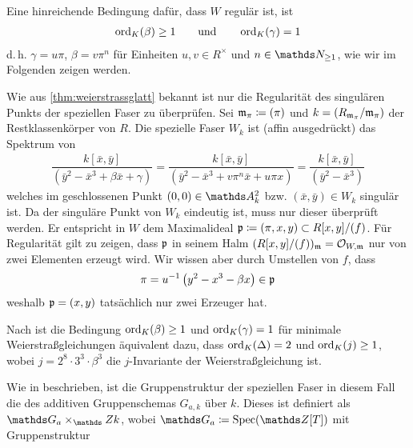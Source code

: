 \begin{Bemerkung}%
  \label{bem:bedregweierstraßmodell}
  Eine hinreichende Bedingung dafür, dass $W$ regulär ist, ist
  \begin{gather*}
    \operatorname{ord}_{K}(\beta)\geq 1
    \qquad\text{und}\qquad
    \operatorname{ord}_{K}(\gamma)=1
  \end{gather*}
  d.\,h. $\gamma=u\pi$, $\beta=v\pi^n$ für Einheiten $u,v\in R^\times$
  und $n\in\N_{\geq1}$, wie wir im Folgenden zeigen werden.
  
  Wie aus \ref{thm:weierstrassglatt} bekannt ist nur die
  Regularität des singulären Punkts der speziellen Faser zu
  überprüfen.
  Sei $\mathfrak{m}_\pi\coloneqq(\pi)$ und $k=(R_{\mathfrak{m}_\pi}/\mathfrak{m}_\pi)$ der
  Restklassenkörper von $R$.
  Die spezielle Faser $W_k$ ist (affin ausgedrückt) das Spektrum von
  \begin{gather*}
    \dfrac{k[\bar x,\bar y]}{(\bar y^2-\bar x^3+\beta \bar x+\gamma)}
    =\dfrac{k[\bar x,\bar y]}{(\bar y^2-\bar x^3+v\pi^n \bar x+u\pi x)}
    =\dfrac{k[\bar x,\bar y]}{(\bar y^2-\bar x^3)}
  \end{gather*}
  welches im geschlossenen Punkt $(0,0)\in\A_k^2$ bzw.
  $(\bar x,\bar y)\in W_k$ singulär ist. Da der singuläre Punkt von
  $W_k$ eindeutig ist, muss nur dieser überprüft werden.
  Er entspricht in $W$ dem Maximalideal
  $\mathfrak{p}\coloneqq(\pi,x,y)\subset R[x,y]/(f)$.
  Für Regularität gilt zu zeigen, dass $\mathfrak{p}$ in seinem Halm
  $(R[x,y]/(f))_{\mathfrak{m}}=\mathcal{O}_{W,\mathfrak{m}}$ nur von zwei Elementen erzeugt wird.
  Wir wissen aber durch Umstellen von $f$, dass
  \begin{gather*}
    \pi = u^{-1}\left( y^2-x^3-\beta x \right)\in\mathfrak{p}
  \end{gather*}
  weshalb $\mathfrak{p}=(x,y)$ tatsächlich nur zwei Erzeuger hat.

  Nach \cite[Chapter 1.5, Lemma 3 and Lemma 4]{neron} ist die
  Bedingung $\operatorname{ord}_{K}(\beta)\geq 1$ und $\operatorname{ord}_{K}(\gamma)=1$ für
  minimale Weierstraßgleichungen äquivalent dazu,
  dass $\operatorname{ord}_{K}(\Delta)=2$ und $\operatorname{ord}_{K}(j)\geq 1$,
  wobei $j=2^8\cdot 3^3\cdot\beta^3$ die $j$-Invariante der
  Weierstraßgleichung ist.

  Wie in \cite[Chapter 1.5]{neron} beschrieben, ist die
  Gruppenstruktur der speziellen Faser in diesem Fall die des
  additiven Gruppenschemas $G_{a,k}$ über $k$. Dieses ist definiert
  als $\G_{a}\times_\Z k$, wobei $\G_{a}\coloneqq\Spec(\Z[T])$ mit
  Gruppenstruktur
  \begin{center}
  \end{center}
\end{Bemerkung}

